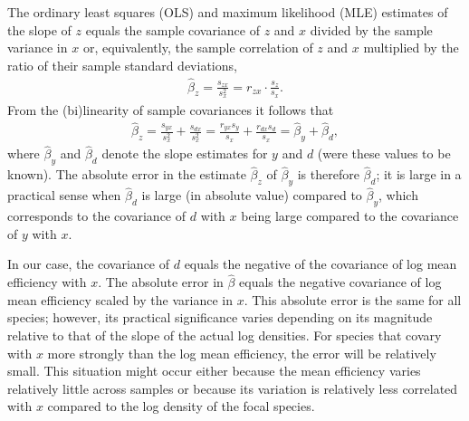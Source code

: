 \documentclass[
]{article}
\begin{document}
The ordinary least squares (OLS) and maximum likelihood (MLE) estimates of the slope of \(z\) equals the sample covariance of \(z\) and \(x\) divided by the sample variance in \(x\) or, equivalently, the sample correlation of \(z\) and \(x\) multiplied by the ratio of their sample standard deviations,
\begin{align}
  \hat \beta_z = \frac{s_{zx}}{s^2_x} = r_{zx} \cdot \frac{s_z}{s_x}.
\end{align}
From the (bi)linearity of sample covariances it follows that
\begin{align}
  \hat \beta_z 
  = \frac{s_{yx}}{s^2_x} + \frac{s_{dx}}{s^2_x} 
  = \frac{r_{yx} s_y}{s_x} + \frac{r_{dx} s_d}{s_x} 
  = \hat \beta_y + \hat \beta_d,
\end{align}
where \(\hat \beta_y\) and \(\hat \beta_d\) denote the slope estimates for \(y\) and \(d\) (were these values to be known).
The absolute error in the estimate \(\hat \beta_{z}\) of \(\hat \beta_{y}\) is therefore \(\hat \beta_{d}\); it is large in a practical sense when \(\hat \beta_{d}\) is large (in absolute value) compared to \(\hat \beta_{y}\), which corresponds to the covariance of \(d\) with \(x\) being large compared to the covariance of \(y\) with \(x\).

In our case, the covariance of \(d\) equals the negative of the covariance of log mean efficiency with \(x\).
The absolute error in \(\hat \beta\) equals the negative covariance of log mean efficiency scaled by the variance in \(x\).
This absolute error is the same for all species; however, its practical significance varies depending on its magnitude relative to that of the slope of the actual log densities.
For species that covary with \(x\) more strongly than the log mean efficiency, the error will be relatively small.
This situation might occur either because the mean efficiency varies relatively little across samples or because its variation is relatively less correlated with \(x\) compared to the log density of the focal species.
\end{document}
